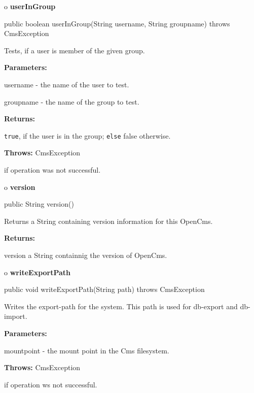 o {\bf userInGroup}

\begin{PRE}
 public boolean userInGroup(String username,
                            String groupname) throws CmsException
\end{PRE}

\begin{description}
\htmlDD Tests, if a user is member of the given group.

\begin{description}
\item {\bf Parameters:}

username - the name of the user to test.

groupname - the name of the group to test.
\item {\bf Returns:}

{\tt true}, if the user is in the group; {\tt else} false otherwise.
\item {\bf Throws:} CmsException

if operation was not successful.
\end{description}

\end{description}

o {\bf version}

\begin{PRE}
 public String version()
\end{PRE}

\begin{description}
\htmlDD Returns a String containing version information for this OpenCms.

\begin{description}
\item {\bf Returns:}

version a String containnig the version of OpenCms.
\end{description}

\end{description}

o {\bf writeExportPath}

\begin{PRE}
 public void writeExportPath(String path) throws CmsException
\end{PRE}

\begin{description}
\htmlDD Writes the export-path for the system. \htmlBR
This path is used for db-export and db-import.

\begin{description}
\item {\bf Parameters:}

mountpoint - the mount point in the Cms filesystem.
\item {\bf Throws:} CmsException

if operation ws not successful.
\end{description}

\end{description}

